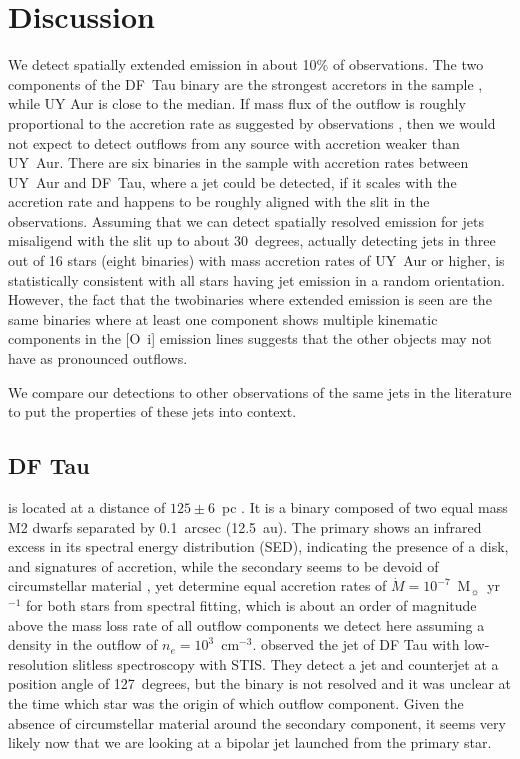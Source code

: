 \documentclass[twocolumn,trackchanges]{aastex63}
\begin{document}
\section{Discussion}
\label{sect:discussion}
We detect spatially extended emission in about 10\% of observations. 
The two components of the DF~Tau binary are the strongest accretors in
  the sample \citep{2003ApJ...583..334H}, while UY Aur is close to the
  median. 
If mass flux of the outflow is roughly
  proportional to the accretion rate as suggested by observations \citep{1990ApJ...354..687C,2008ApJ...689.1112C},
  then we would not expect to detect outflows from any source with accretion
  weaker than UY~Aur. There are six binaries in the sample with accretion rates
between UY~Aur and DF~Tau, where a jet could be detected, if it scales with the
accretion rate and happens to be roughly aligned with the slit in the
observations. Assuming that we can detect spatially resolved emission for jets
misaligend with the slit up to about 30~degrees, actually detecting jets in
three out of 16 stars (eight binaries) with mass accretion rates of UY~Aur or
higher, is statistically consistent with all stars having jet emission in a
random orientation.
 However, the fact that the twobinaries where extended
  emission is seen are the same binaries where at least one component shows multiple kinematic
components in the [O~{\sc i}] emission lines \citep{2003ApJ...583..334H}
suggests that the other objects may not have as pronounced outflows.

We compare our detections to other observations of the same jets in the literature to put the properties of these jets into context.

\subsection{DF Tau}

 is located at a distance of $125\pm6$~pc
\citep{2016A&A...595A...1G,2018A&A...616A...1G}. It is a binary composed of two
equal mass M2 dwarfs separated by 0.1~arcsec (12.5~au). The primary shows an
infrared excess in its spectral energy distribution (SED), indicating the
presence of a disk, and signatures of accretion, while the secondary seems to
be devoid of circumstellar material \citep{2017ApJ...845..161A}, yet
\citet{2003ApJ...583..334H} determine equal accretion rates of $\dot
M=10^{-7}$~M$_{\sun}$~yr$^{-1}$ for both stars from spectral fitting, which is
about an order of magnitude above the mass loss rate of all outflow components
we detect here assuming a density in the outflow of $n_e=10^3$~cm$^{-3}$.
\citet{2004ApJ...609..261H} observed the jet of DF Tau with low-resolution slitless spectroscopy with STIS. They detect a jet and counterjet at a
position angle of 127~degrees, but the binary is not resolved and it was unclear at the time which star was the origin of which outflow component. Given the absence of circumstellar material around the secondary component, it seems very likely now that we are looking at a bipolar jet launched from the primary star. 
\end{document}
